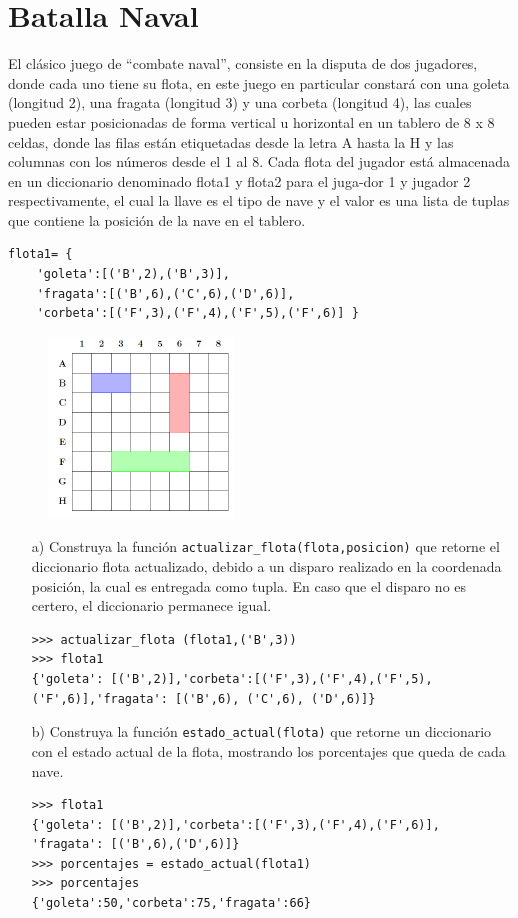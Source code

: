 \section{Batalla Naval}

El clásico juego de “combate naval”, consiste en la disputa de dos jugadores, donde cada uno tiene su flota, en este juego en particular constará con una goleta (longitud 2), una fragata (longitud 3) y una corbeta (longitud 4), las cuales pueden estar posicionadas de forma vertical u horizontal en un tablero de 8 x 8 celdas, donde las filas están etiquetadas desde la letra A hasta la H y las columnas con los números desde el 1 al 8. Cada flota del jugador está almacenada en un diccionario denominado flota1 y flota2 para el juga-dor 1 y jugador 2 respectivamente, el cual la llave es el tipo de nave y el valor es una lista de tuplas que contiene la posición de la nave en el tablero.

\begin{lstlisting}[style=consola]
flota1= {
    'goleta':[('B',2),('B',3)],
    'fragata':[('B',6),('C',6),('D',6)],
    'corbeta':[('F',3),('F',4),('F',5),('F',6)] }
\end{lstlisting}

\begin{figure}[h]
    \centering
    \includegraphics{Imagenes/batalla.png}
\end{figure}

\begin{itemize}
    \item[a)] Construya la función \texttt{actualizar\_flota(flota,posicion)} que retorne el diccionario flota actualizado, debido a un disparo realizado en la coordenada posición, la cual es entregada como tupla. En caso que el disparo no es certero, el diccionario permanece igual.
    \begin{lstlisting}[style=consola]
>>> actualizar_flota (flota1,('B',3))
>>> flota1
{'goleta': [('B',2)],'corbeta':[('F',3),('F',4),('F',5),
('F',6)],'fragata': [('B',6), ('C',6), ('D',6)]} 
    \end{lstlisting}
    \item[b)] Construya la función \texttt{estado\_actual(flota)} que retorne un diccionario con el estado actual de la flota, mostrando los porcentajes que queda de cada nave.
    \begin{lstlisting}[style=consola]
>>> flota1
{'goleta': [('B',2)],'corbeta':[('F',3),('F',4),('F',6)],
'fragata': [('B',6),('D',6)]}
>>> porcentajes = estado_actual(flota1)
>>> porcentajes
{'goleta':50,'corbeta':75,'fragata':66}
    \end{lstlisting}
\end{itemize}